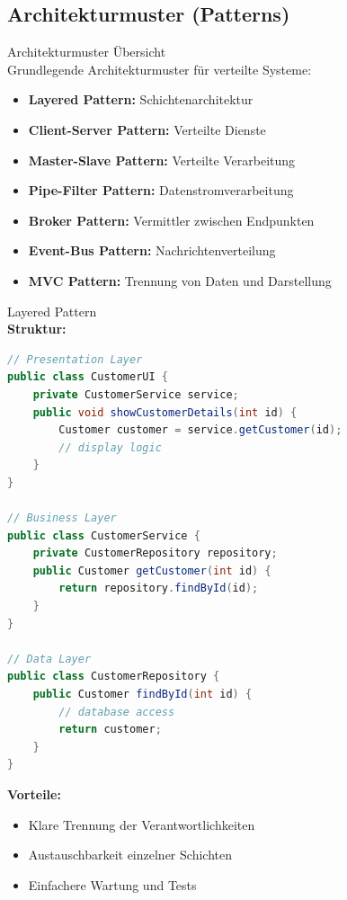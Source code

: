 \subsection{Architekturmuster (Patterns)}

\begin{concept}{Architekturmuster Übersicht}\\
Grundlegende Architekturmuster für verteilte Systeme:
\begin{itemize}
    \item \textbf{Layered Pattern:} Schichtenarchitektur
    \item \textbf{Client-Server Pattern:} Verteilte Dienste
    \item \textbf{Master-Slave Pattern:} Verteilte Verarbeitung
    \item \textbf{Pipe-Filter Pattern:} Datenstromverarbeitung
    \item \textbf{Broker Pattern:} Vermittler zwischen Endpunkten
    \item \textbf{Event-Bus Pattern:} Nachrichtenverteilung
    \item \textbf{MVC Pattern:} Trennung von Daten und Darstellung
\end{itemize}
\end{concept}

\begin{example2}{Layered Pattern}\\
\textbf{Struktur:}
\begin{lstlisting}[language=Java, style=basesmol]
// Presentation Layer
public class CustomerUI {
    private CustomerService service;
    public void showCustomerDetails(int id) {
        Customer customer = service.getCustomer(id);
        // display logic
    }
}

// Business Layer
public class CustomerService {
    private CustomerRepository repository;
    public Customer getCustomer(int id) {
        return repository.findById(id);
    }
}

// Data Layer
public class CustomerRepository {
    public Customer findById(int id) {
        // database access
        return customer;
    }
}
\end{lstlisting}

\textbf{Vorteile:}
\begin{itemize}
    \item Klare Trennung der Verantwortlichkeiten
    \item Austauschbarkeit einzelner Schichten
    \item Einfachere Wartung und Tests
\end{itemize}
\end{example2}

